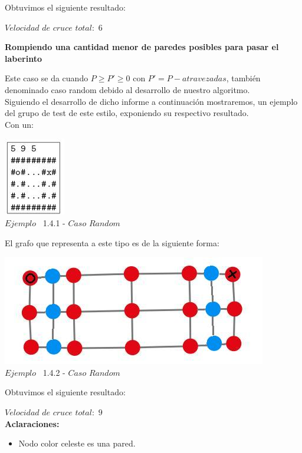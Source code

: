   Obtuvimos el siguiente resultado:

$Velocidad$ $de$ $cruce$ $total: $ $6$


\begin{center}
 \textbf{Rompiendo una cantidad menor de paredes posibles para pasar el laberinto}
\end{center}

Este caso se da cuando $P \geq P' \geq 0$ con $P' = P - atravezadas$, tambi\'en denominado caso random debido al desarrollo de nuestro algoritmo.\\

Siguiendo el desarrollo de dicho informe a continuaci\'on mostraremos, un ejemplo del grupo de test de este estilo, exponiendo su respectivo resultado.\\
 
 Con un:
 
\vspace*{0.3cm} \vspace*{0.3cm}
  \begin{center}
 \includegraphics[scale=0.65]{./EJ1/ej1random.jpeg}
\\ {$Ejemplo$ \ 1.4.1 - $Caso$ $Random$}
  \end{center}
  \vspace*{0.3cm}

El grafo que representa a este tipo es de la siguiente forma:\\

\vspace*{0.3cm} \vspace*{0.3cm}
  \begin{center}
 \includegraphics[scale=0.5]{./EJ1/ej1graforandom.jpeg}
 \\{$Ejemplo$ \ 1.4.2 - $Caso$ $Random$}
  \end{center}
  \vspace*{0.3cm}

  Obtuvimos el siguiente resultado:

$Velocidad$ $de$ $cruce$ $total: $ $9$\\


\textbf{Aclaraciones:} 
\begin{itemize}
\item Nodo color celeste es una pared.
\end{itemize}
